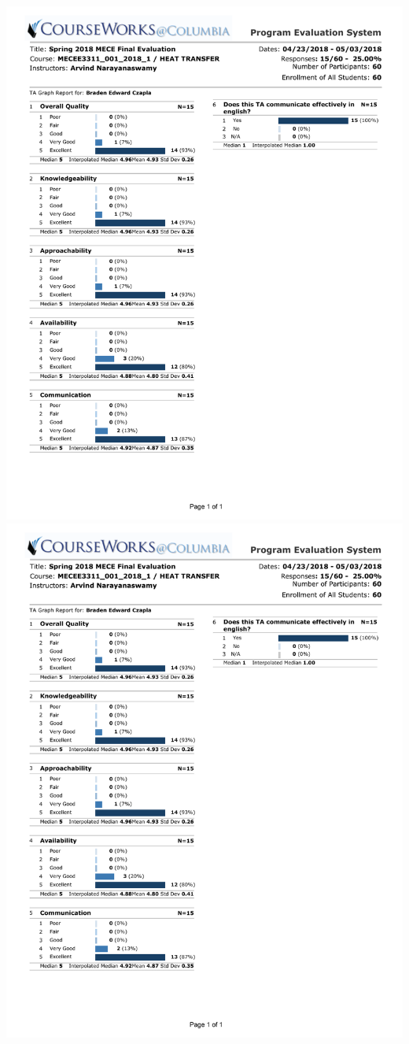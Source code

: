 \includegraphics*[width=\textwidth, page=2, trim={0.25in 1in 0.25in 0.25in}]{./Teaching_Evaluations/BradenCzapla_TAEvaluation_Spring2018.pdf}
\includegraphics*[width=\textwidth, page=3, trim={0.25in 6in 0.25in 0.25in}]{./Teaching_Evaluations/BradenCzapla_TAEvaluation_Spring2018.pdf}